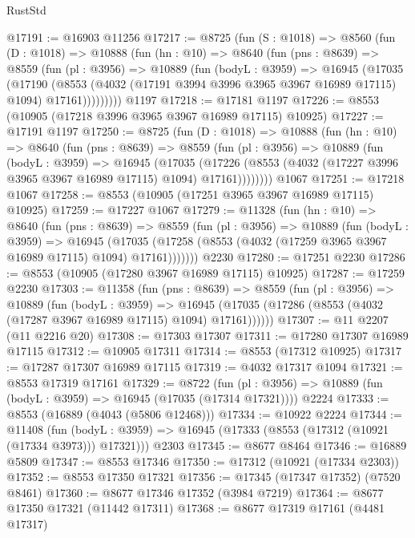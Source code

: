 \begin{lexlean}{RustStd}
\begin{coremodule}
@17191 := @16903 @11256
@17217 := @8725
    (fun (S : @1018) =>
    @8560
      (fun (D : @1018) =>
      @10888
        (fun (hn : @10) =>
        @8640
          (fun (pns : @8639) =>
          @8559
            (fun (pl : @3956) =>
            @10889
              (fun (bodyL : @3959) =>
              @16945
                (@17035
                  (@17190
                    (@8553
                      (@4032 (@17191 @3994 @3996 @3965 @3967 @16989 @17115) @1094)
                      @17161)))))))))
    @1197
@17218 := @17181 @1197
@17226 := @8553 (@10905 (@17218 @3996 @3965 @3967 @16989 @17115) @10925)
@17227 := @17191 @1197
@17250 := @8725
    (fun (D : @1018) =>
    @10888
      (fun (hn : @10) =>
      @8640
        (fun (pns : @8639) =>
        @8559
          (fun (pl : @3956) =>
          @10889
            (fun (bodyL : @3959) =>
            @16945
              (@17035
                (@17226 (@8553 (@4032 (@17227 @3996 @3965 @3967 @16989 @17115) @1094) @17161))))))))
    @1067
@17251 := @17218 @1067
@17258 := @8553 (@10905 (@17251 @3965 @3967 @16989 @17115) @10925)
@17259 := @17227 @1067
@17279 := @11328
    (fun (hn : @10) =>
    @8640
      (fun (pns : @8639) =>
      @8559
        (fun (pl : @3956) =>
        @10889
          (fun (bodyL : @3959) =>
          @16945
            (@17035 (@17258 (@8553 (@4032 (@17259 @3965 @3967 @16989 @17115) @1094) @17161)))))))
    @2230
@17280 := @17251 @2230
@17286 := @8553 (@10905 (@17280 @3967 @16989 @17115) @10925)
@17287 := @17259 @2230
@17303 := @11358
    (fun (pns : @8639) =>
    @8559
      (fun (pl : @3956) =>
      @10889
        (fun (bodyL : @3959) =>
        @16945 (@17035 (@17286 (@8553 (@4032 (@17287 @3967 @16989 @17115) @1094) @17161))))))
@17307 := @11 @2207 (@11 @2216 @20)
@17308 := @17303 @17307
@17311 := @17280 @17307 @16989 @17115
@17312 := @10905 @17311
@17314 := @8553 (@17312 @10925)
@17317 := @17287 @17307 @16989 @17115
@17319 := @4032 @17317 @1094
@17321 := @8553 @17319 @17161
@17329 := @8722
    (fun (pl : @3956) => @10889 (fun (bodyL : @3959) => @16945 (@17035 (@17314 @17321))))
    @2224
@17333 := @8553 (@16889 (@4043 (@5806 @12468)))
@17334 := @10922 @2224
@17344 := @11408
    (fun (bodyL : @3959) => @16945 (@17333 (@8553 (@17312 (@10921 (@17334 @3973))) @17321)))
    @2303
@17345 := @8677 @8464
@17346 := @16889 @5809
@17347 := @8553 @17346
@17350 := @17312 (@10921 (@17334 @2303))
@17352 := @8553 @17350 @17321
@17356 := @17345 (@17347 @17352) (@7520 @8461)
@17360 := @8677 @17346 @17352 (@3984 @7219)
@17364 := @8677 @17350 @17321 (@11442 @17311)
@17368 := @8677 @17319 @17161 (@4481 @17317)

\end{coremodule}
\end{lexlean}
